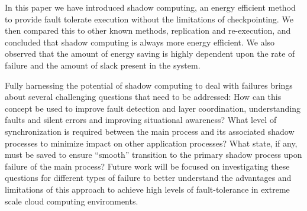 
In this paper we have introduced shadow computing, an energy efficient
method to provide fault tolerate execution without the limitations of
checkpointing. We then compared this to other known methods,
replication and re-execution, and concluded that shadow computing is
always more energy efficient. We also observed that the amount of
energy saving is highly dependent upon the rate of failure and the
amount of slack present in the system.

Fully harnessing the potential of shadow computing to deal with
failures brings about several challenging questions that need to be
addressed: How can this concept be used to improve fault detection and
layer coordination, understanding faults and silent errors and
improving situational awareness? What level of synchronization is
required between the main process and its associated shadow processes
to minimize impact on other application processes? What state, if any,
must be saved to ensure “smooth” transition to the primary shadow
process upon failure of the main process?  Future work will be focused
on investigating these questions for different types of failure to
better understand the advantages and limitations of this approach to
achieve high levels of fault-tolerance in extreme scale cloud
computing environments.

